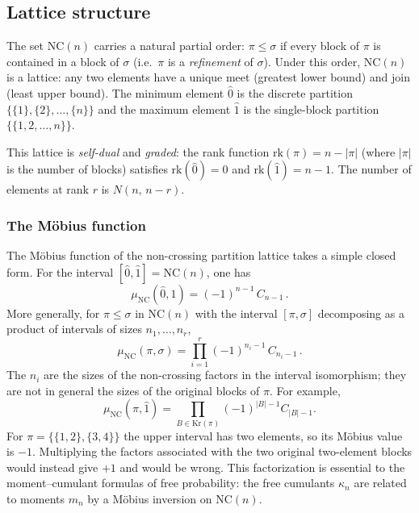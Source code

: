 \documentclass[11pt,letterpaper]{article}
\theoremstyle{plain}
\theoremstyle{definition}
\theoremstyle{remark}
\begin{document}
\subsection{Lattice structure}

The set $\mathrm{NC}(n)$ carries a natural partial order: $\pi \le \sigma$ if
every block of $\pi$ is contained in a block of $\sigma$ (i.e.\ $\pi$ is a
\emph{refinement} of $\sigma$).  Under this order, $\mathrm{NC}(n)$ is a
lattice: any two elements have a unique meet (greatest lower bound) and join
(least upper bound).  The minimum element $\hat{0}$ is the discrete partition
$\bigl\{\{1\},\{2\},\dots,\{n\}\bigr\}$ and the maximum element $\hat{1}$ is
the single-block partition $\bigl\{\{1,2,\dots,n\}\bigr\}$.

This lattice is \emph{self-dual} and \emph{graded}: the rank function
$\mathrm{rk}(\pi) = n - |\pi|$ (where $|\pi|$ is the number of blocks)
satisfies $\mathrm{rk}(\hat{0}) = 0$ and $\mathrm{rk}(\hat{1}) = n-1$.
The number of elements at rank $r$ is $N(n,\, n - r)$.

\subsubsection{The M\"obius function}

The M\"obius function of the non-crossing partition lattice takes a
simple closed form.  For the interval
$[\hat{0},\hat{1}] = \mathrm{NC}(n)$, one has \cite{kreweras1972}
\begin{equation}
  \mu_{\mathrm{NC}}(\hat{0},\hat{1})
  = (-1)^{n-1}\, C_{n-1}\,.
  \label{eq16:mobius_nc}
\end{equation}
More generally, for $\pi \le \sigma$ in $\mathrm{NC}(n)$ with the interval
$[\pi,\sigma]$ decomposing as a product of intervals of sizes $n_1, \dots, n_r$,
\begin{equation}
  \mu_{\mathrm{NC}}(\pi,\sigma)
  = \prod_{i=1}^{r} (-1)^{n_i - 1}\, C_{n_i - 1}\,.
  \label{eq16:mobius_interval}
\end{equation}
The $n_i$ are the sizes of the non-crossing factors in the interval
isomorphism; they are not in general the sizes of the original blocks of
$\pi$.  For example,
\begin{equation}
 \mu_{\mathrm{NC}}(\pi,\hat1)
 =\prod_{B\in\mathrm{Kr}(\pi)}(-1)^{|B|-1}C_{|B|-1}.
 \label{eq16:mobius_complement}
\end{equation}
For $\pi=\{\{1,2\},\{3,4\}\}$ the upper interval has two elements,
so its M\"obius value is $-1$.  Multiplying the factors associated with the
two original two-element blocks would instead give $+1$ and would be wrong.
This factorization is essential to the moment--cumulant formulas of free
probability: the free cumulants $\kappa_n$ are related to moments $m_n$ by a
M\"obius inversion on $\mathrm{NC}(n)$.
\end{document}
